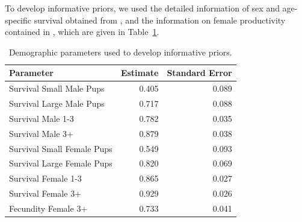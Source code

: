 \documentclass[12pt, titlepage]{article}\usepackage[]{graphicx}\usepackage[]{color}
\begin{document}
To develop informative priors, we used the detailed information of sex and age-specific survival obtained from \citet{Hast:Smal:Pend:sex:2012}, and the information on female productivity contained in \citet{Pitc:Calk:biol:1979}, which are given in Table~\ref{tab:demparms}.


\begin{table}[ht]
\centering
\caption{Demographic parameters used to develop informative priors. \label{tab:demparms}} 
\begin{tabular}{lrr}
  \hline
Parameter & Estimate & Standard Error \\ 
  \hline
Survival Small Male Pups & 0.405 & 0.089 \\ 
  Survival Large Male Pups & 0.717 & 0.088 \\ 
  Survival Male 1-3 & 0.782 & 0.035 \\ 
  Survival Male 3+ & 0.879 & 0.038 \\ 
  Survival Small Female Pups & 0.549 & 0.093 \\ 
  Survival Large Female Pups & 0.820 & 0.069 \\ 
  Survival Female 1-3 & 0.865 & 0.027 \\ 
  Survival Female 3+ & 0.929 & 0.026 \\ 
  Fecundity Female 3+ & 0.733 & 0.041 \\ 
   \hline
\end{tabular}
\end{table}


  
\end{document}
